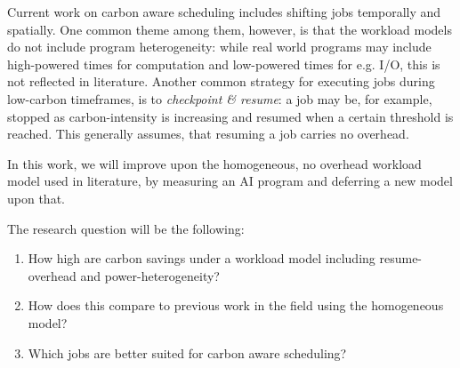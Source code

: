 Current work on carbon aware scheduling includes shifting jobs temporally and spatially. 
One common theme among them, however, is that the workload models do not include program heterogeneity: while real world programs may include high-powered times for computation and low-powered times for e.g. I/O, this is not reflected in literature. 
Another common strategy for executing jobs during low-carbon timeframes, is to \emph{checkpoint \& resume}: a job may be, for example, stopped as carbon-intensity is increasing and resumed when a certain threshold is reached. 
This generally assumes, that resuming a job carries no overhead. 

In this work, we will improve upon the homogeneous, no overhead workload model used in literature, by measuring an AI program and deferring a new model upon that.

The research question will be the following:

\begin{enumerate}
    \item How high are carbon savings under a workload model including resume-overhead and power-heterogeneity?
    \item How does this compare to previous work in the field using the homogeneous model?
    \item Which jobs are better suited for carbon aware scheduling?
\end{enumerate}
